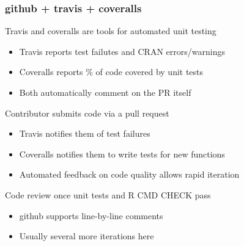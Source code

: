 \documentclass[12 pt]{beamer}\usepackage[]{graphicx}\usepackage[]{color}
\begin{document}
  \begin{frame}[fragile]
\frametitle{github + travis + coveralls}

Travis and coveralls are tools for automated unit testing
\begin{itemize}
\item Travis reports test failutes and CRAN errors/warnings
\item Coveralls reports \% of code covered by unit tests
\item Both automatically comment on the PR itself
\end{itemize}

\vspace{.1in}

Contributor submits code via a pull request

\begin{itemize}
\item Travis notifies them of test failures
\item Coveralls notifies them to write tests for new functions
\item Automated feedback on code quality allows rapid iteration
\end{itemize}

\vspace{.1in}

Code review once unit tests and R CMD CHECK pass
\begin{itemize}
\item github supports line-by-line comments
\item Usually several more iterations here
\end{itemize}

\end{frame}




\end{document}
